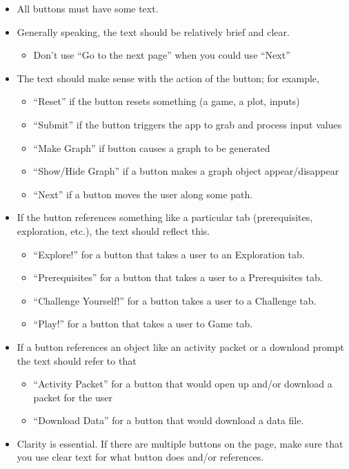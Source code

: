 \documentclass[]{book}
\providecommand{\tightlist}{%
  \setlength{\itemsep}{0pt}\setlength{\parskip}{0pt}}
\begin{document}
\begin{itemize}
\tightlist
\item
  All buttons must have some text.
\item
  Generally speaking, the text should be relatively brief and clear.

  \begin{itemize}
  \tightlist
  \item
    Don't use ``Go to the next page'' when you could use ``Next''
  \end{itemize}
\item
  The text should make sense with the action of the button; for example,

  \begin{itemize}
  \tightlist
  \item
    ``Reset'' if the button resets something (a game, a plot, inputs)
  \item
    ``Submit'' if the button triggers the app to grab and process input values
  \item
    ``Make Graph'' if button causes a graph to be generated
  \item
    ``Show/Hide Graph'' if a button makes a graph object appear/disappear
  \item
    ``Next'' if a button moves the user along some path.
  \end{itemize}
\item
  If the button references something like a particular tab (prerequisites, exploration, etc.), the text should reflect this.

  \begin{itemize}
  \tightlist
  \item
    ``Explore!'' for a button that takes a user to an Exploration tab.
  \item
    ``Prerequisites'' for a button that takes a user to a Prerequisites tab.
  \item
    ``Challenge Yourself!'' for a button takes a user to a Challenge tab.
  \item
    ``Play!'' for a button that takes a user to Game tab.
  \end{itemize}
\item
  If a button references an object like an activity packet or a download prompt the text should refer to that

  \begin{itemize}
  \tightlist
  \item
    ``Activity Packet'' for a button that would open up and/or download a packet for the user
  \item
    ``Download Data'' for a button that would download a data file.
  \end{itemize}
\item
  Clarity is essential. If there are multiple buttons on the page, make sure that you use clear text for what button does and/or references.
\end{itemize}
\end{document}
